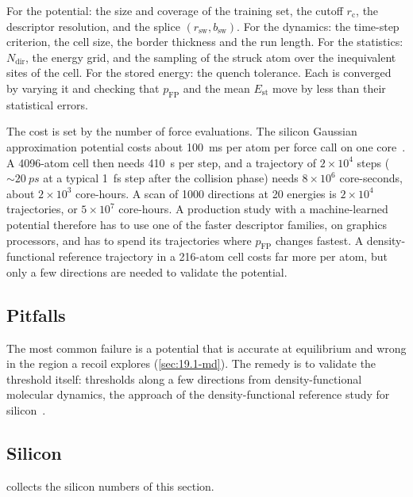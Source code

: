 For the potential: the size and coverage of the training set, the cutoff $r_{\mathrm{c}}$, the descriptor resolution, and the splice $(r_{\mathrm{sw}}, b_{\mathrm{sw}})$. For the dynamics: the time-step criterion, the cell size, the border thickness and the run length. For the statistics: $N_{\mathrm{dir}}$, the energy grid, and the sampling of the struck atom over the inequivalent sites of the cell. For the stored energy: the quench tolerance. Each is converged by varying it and checking that $p_{\mathrm{FP}}$ and the mean $E_{\mathrm{st}}$ move by less than their statistical errors.

The cost is set by the number of force evaluations. The silicon Gaussian approximation potential costs about \SI{100}{ms} per atom per force call on one core~\cite[Sect.~V]{bartok2018machine}. A 4096-atom cell then needs \SI{410}{s} per step, and a trajectory of $2\times10^4$ steps ($\sim\SI{20}{ps}$ at a typical \SI{1}{fs} step after the collision phase) needs $8\times10^6$ core-seconds, about $2\times10^3$ core-hours. A scan of 1000 directions at 20 energies is $2\times10^4$ trajectories, or $5\times10^7$ core-hours. A production study with a machine-learned potential therefore has to use one of the faster descriptor families, on graphics processors, and has to spend its trajectories where $p_{\mathrm{FP}}$ changes fastest. A density-functional reference trajectory in a 216-atom cell costs far more per atom, but only a few directions are needed to validate the potential.

\subsection{Pitfalls}

The most common failure is a potential that is accurate at equilibrium and wrong in the region a recoil explores (\cref{sec:19.1-md}). The remedy is to validate the threshold itself: thresholds along a few directions from density-functional molecular dynamics, the approach of the density-functional reference study for silicon~\cite{holmstrom2008threshold}.

\subsection{Silicon}

 collects the silicon numbers of this section.

